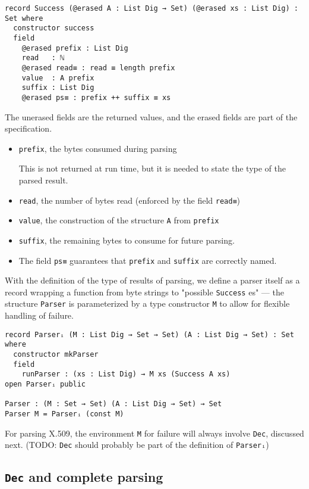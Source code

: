 \documentclass[11pt]{article}
\begin{document}
\begin{verbatim}
record Success (@erased A : List Dig → Set) (@erased xs : List Dig) : Set where
  constructor success
  field
    @erased prefix : List Dig
    read   : ℕ
    @erased read≡ : read ≡ length prefix
    value  : A prefix
    suffix : List Dig
    @erased ps≡ : prefix ++ suffix ≡ xs
\end{verbatim}

The unerased fields are the returned values, and the erased fields are
part of the specification.
\begin{itemize}
\item \texttt{prefix}, the bytes consumed during parsing

This is not returned at run time, but it is needed to state the type of the
parsed result.
\item \texttt{read}, the number of bytes read (enforced by the field \texttt{read≡})
\item \texttt{value}, the construction of the structure \texttt{A} from \texttt{prefix}
\item \texttt{suffix}, the remaining bytes to consume for future parsing.
\item The field \texttt{ps≡} guarantees that \texttt{prefix} and \texttt{suffix} are correctly named.
\end{itemize}

With the definition of the type of results of parsing, we define a parser
itself as a record wrapping a function from byte strings to "possible
\texttt{Success} es" --- the structure \texttt{Parser} is parameterized by a type
constructor \texttt{M} to allow for flexible handling of failure.

\begin{verbatim}
record Parserᵢ (M : List Dig → Set → Set) (A : List Dig → Set) : Set where
  constructor mkParser
  field
    runParser : (xs : List Dig) → M xs (Success A xs)
open Parserᵢ public

Parser : (M : Set → Set) (A : List Dig → Set) → Set
Parser M = Parserᵢ (const M)
\end{verbatim}

For parsing X.509, the environment \texttt{M} for failure will always involve \texttt{Dec},
discussed next. (TODO: \texttt{Dec} should probably be part of the definition of \texttt{Parserᵢ})

\subsection{\texttt{Dec} and complete parsing}
\label{sec:org39e8479}
\end{document}
